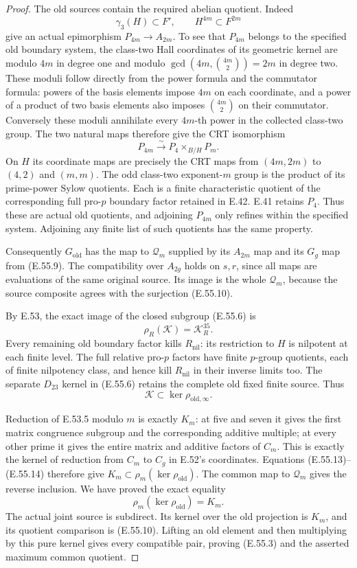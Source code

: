\begin{proof}
The old sources contain the required abelian
quotient. Indeed
\[
 \gamma_3(H)\subset F',\qquad H^{4m}\subset F^{2m}
 \tag{E.55.11}
\]
give an actual epimorphism $P_{4m}\to A_{2m}$.
To see that $P_{4m}$ belongs to the specified old
boundary system, the class-two Hall coordinates
of its geometric kernel are modulo $4m$ in degree
one and modulo
$\gcd(4m,\binom{4m}{2})=2m$ in degree two.
These moduli follow directly from the power
formula and the commutator formula: powers of
the basis elements impose $4m$ on each coordinate,
and a power of a product of two basis elements
also imposes $\binom{4m}{2}$ on their commutator.
Conversely these moduli annihilate every $4m$-th
power in the collected class-two group.
The two natural maps therefore give the CRT
isomorphism
\[
                    P_{4m}\xrightarrow{\sim}P_4\times_{B/H}P_m.
 \tag{E.55.12}
\]
On $H$ its coordinate maps are precisely the CRT
maps from $(4m,2m)$ to $(4,2)$ and $(m,m)$.
The odd class-two exponent-$m$ group is the product
of its prime-power Sylow quotients. Each is a
finite characteristic quotient of the corresponding
full pro-$p$ boundary factor retained in E.42.
E.41 retains $P_4$. Thus these are actual old
quotients, and adjoining $P_{4m}$ only refines
within the specified system. Adjoining any finite
list of such quotients has the same property.

Consequently $G_{\mathrm{old}}$ has the map to
$\mathcal Q_m$ supplied by its $A_{2m}$ map and
its $G_g$ map from \textup{(E.55.9)}.
The compatibility over $A_{2g}$ holds on $s,r$,
since all maps are evaluations of the same original
source. Its image is the whole $\mathcal Q_m$,
because the source composite agrees with the
surjection \textup{(E.55.10)}.

By E.53, the exact image of the closed subgroup
\textup{(E.55.6)} is
\[
                         \rho_R(\mathscr K)=\mathcal K_R^{35}.
 \tag{E.55.13}
\]
Every remaining old boundary factor kills
$R_{\mathrm{nil}}$: its restriction to $H$ is
nilpotent at each finite level. The full relative
pro-$p$ factors have finite $p$-group quotients,
each of finite nilpotency class, and hence kill
$R_{\mathrm{nil}}$ in their inverse limits too.
The separate $D_{23}$ kernel in
\textup{(E.55.6)} retains the complete old fixed
finite source. Thus
\[
              \mathscr K\subset\ker\rho_{\mathrm{old},\infty}.
 \tag{E.55.14}
\]

Reduction of E.53.5 modulo $m$ is exactly $K_m$:
at five and seven it gives the first matrix
congruence subgroup and the corresponding additive
multiple; at every other prime it gives the
entire matrix and additive factors of $C_m$.
This is exactly the kernel of reduction from
$C_m$ to $C_g$ in E.52's coordinates.
Equations \textup{(E.55.13)--(E.55.14)} therefore give
$K_m\subset\rho_m(\ker\rho_{\mathrm{old}})$.
The common map to $\mathcal Q_m$ gives the reverse
inclusion. We have proved the exact equality
\[
                     \rho_m(\ker\rho_{\mathrm{old}})=K_m.
 \tag{E.55.15}
\]
The actual joint source is subdirect. Its kernel
over the old projection is $K_m$, and its quotient
comparison is \textup{(E.55.10)}. Lifting an old
element and then multiplying by this pure kernel
gives every compatible pair, proving
\textup{(E.55.3)} and the asserted maximum common
quotient.


\end{proof}
